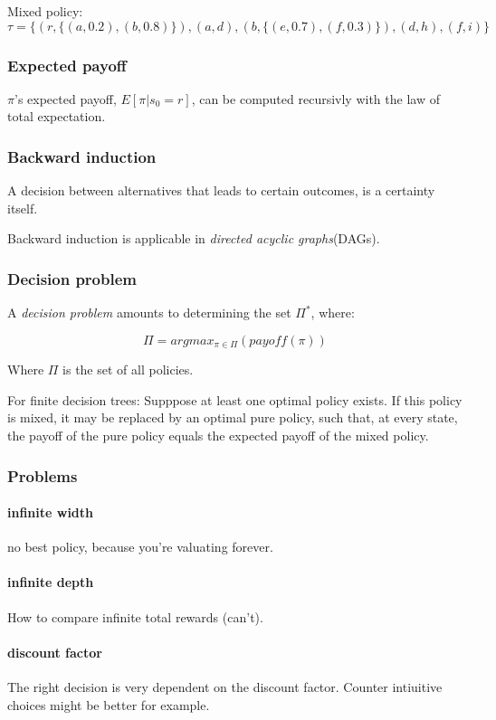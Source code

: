 \documentclass{article}
\begin{document}
Mixed policy:
\[ \tau = \{(r,\{(a, 0.2), (b,0.8)\}),(a,d),(b,\{(e, 0.7), (f,0.3)\}),
(d,h),(f,i)\} \]

\subsubsection{Expected payoff}
$\pi$'s expected payoff, $E[\pi|s_0=r]$, can be computed recursivly with the
law of total expectation.

\subsubsection{Backward induction}
A decision between alternatives that leads to certain outcomes, is a certainty
itself.

Backward induction is applicable in \emph{directed acyclic graphs}(DAGs).

\subsubsection{Decision problem}
A \emph{decision problem} amounts to determining the set $\Pi^*$, where:

\[ \Pi = argmax_{\pi \in \Pi}(payoff(\pi))\]

Where $\Pi$ is the set of all policies.

For finite decision trees: Supppose at least one optimal policy exists.
If this policy is mixed, it may be replaced by an optimal pure policy,
such that, at every state, the payoff of the pure policy equals the expected
payoff of the mixed policy.

\subsubsection{Problems}
\paragraph{infinite width} no best policy, because you're valuating forever.
\paragraph{infinite depth} How to compare infinite total rewards (can't).
\paragraph{discount factor} The right decision is very dependent on the
discount factor. Counter intiuitive choices might be better for example.
\end{document}
